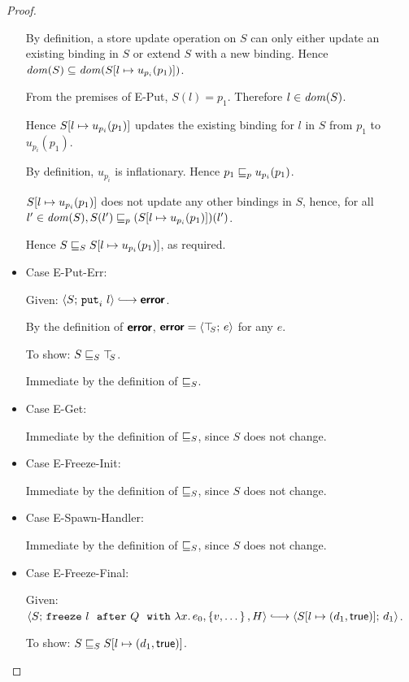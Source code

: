 \begin{proof}
\begin{itemize}
      By definition, a store update operation on $S$ can only either
      update an existing binding in $S$ or extend $S$ with a new
      binding.  Hence $\mathit{dom}(S) \subseteq
      \mathit{dom}(S[l \mapsto u_{p_i}(p_1)])$.

      From the premises of {\sc E-Put}, $S(l) = p_1$.  Therefore $l
      \in \mathit{dom}(S)$.

      Hence $S[l \mapsto u_{p_i}(p_1)]$ updates the existing
      binding for $l$ in $S$ from $p_1$ to $u_{p_i}(p_1)$.

      By definition, $u_{p_i}$ is inflationary.  Hence $p_1 \sqsubseteq_p
      u_{p_i}(p_1)$.

      $S[l \mapsto u_{p_i}(p_1)]$ does not update any other
      bindings in $S$, hence, for all $l' \in \mathit{dom}(S), S(l') \sqsubseteq_p
      (S[l \mapsto u_{p_i}(p_1)])(l')$.

      Hence $S \sqsubseteq_S S[l \mapsto u_{p_i}(p_1)]$, as required.

    \item Case {\sc E-Put-Err}:

      Given: $\config{S}{\putiexp{l}} \parstepsto \error$.

      By the definition of $\textbf{\textsf{error}}$, $\textbf{\textsf{error}} = \langle \top\hspace{-0.85mm}_{S};\, e \rangle$ for
      any $e$.

      To show: $S \sqsubseteq_S \top\hspace{-0.85mm}_{S}$.

      Immediate by the definition of $ \sqsubseteq_S $.

    \item Case {\sc E-Get}:

      Immediate by the definition of $ \sqsubseteq_S $, since $S$ does
      not change.

    \item Case {\sc E-Freeze-Init}:

      Immediate by the definition of $ \sqsubseteq_S $, since $S$ does
      not change.

    \item Case {\sc E-Spawn-Handler}:

      Immediate by the definition of $ \sqsubseteq_S $, since $S$ does
      not change.

    \item Case {\sc E-Freeze-Final}:

      Given:
      $\config{S}{\freezeafterfull{l}{Q}{\lam{x}{e_0}}{\setof{v,
            \dots}}{H}} \parstepsto
      \config{\extS{S}{l}{d_1}{\frozentrue}}{d_1}$.

      To show: $S \sqsubseteq_S S[l \mapsto (d_1, \textsf{true})]$.


\end{itemize}
\end{proof}
